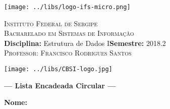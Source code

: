 \documentclass[11pt,a4paper]{article}
\begin{document}
	

	
\frenchspacing
\begin{center}
    \begin{minipage}{1.7cm}
		\begin{center}
			\texttt{[image: ../libs/logo-ifs-micro.png]}
		\end{center}
	\end{minipage}
	\begin{minipage}{11.4cm}
		\begin{center}
				{\small \textsc{Instituto Federal de Sergipe}			\\
						  \textsc{Bacharelado em Sistemas de Informação} \\
                         \textbf{Disciplina:} Estrutura de Dados I\hspace{.65cm}\textbf{Semestre:} 2018.2\\
                          \textsc{Professor: Francisco Rodrigues Santos}\\
                }
		\end{center}
	\end{minipage}
	\begin{minipage}{1.6cm}
		\begin{center}
			\texttt{[image: ../libs/CBSI-logo.jpg]}
		\end{center}
	\end{minipage}
\end{center}


{\sf
  \begin{center}
    \Large \textbf{--- Lista Encadeada Circular ---}%
  \end{center}
}\bigskip

\setlength{\marginparwidth}{5cm}
\small \noindent \textbf{Nome:}\hspace{0.3cm}\hrulefill \hrulefill

\reversemarginpar
\thispagestyle{empty}\bigskip





\end{document}
